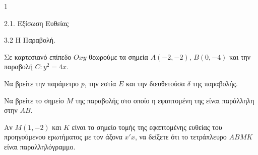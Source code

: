 \begin{ylh}{1}
    \item 2.1. Εξίσωση Ευθείας
    \item 3.2 Η Παραβολή.
\end{ylh}
Σε καρτεσιανό επίπεδο $Oxy$ θεωρούμε τα σημεία $A(-2, -2)$, $B(0, -4)$ και την παραβολή $C: y^2 = 4x$.
\begin{alist}
\item Να βρείτε την παράμετρο $p$, την εστία $E$ και την διευθετούσα $\delta$ της παραβολής. 
\item Να βρείτε το σημείο $M$ της παραβολής στο οποίο η εφαπτομένη της είναι παράλληλη στην $AB$. 
\item Αν $M(1,-2)$ και $K$ είναι το σημείο τομής της εφαπτομένης ευθείας του προηγούμενου ερωτήματος με τον άξονα $x'x$, να δείξετε ότι το τετράπλευρο $ABMK$ είναι παραλληλόγραμμο. 
\end{alist}
